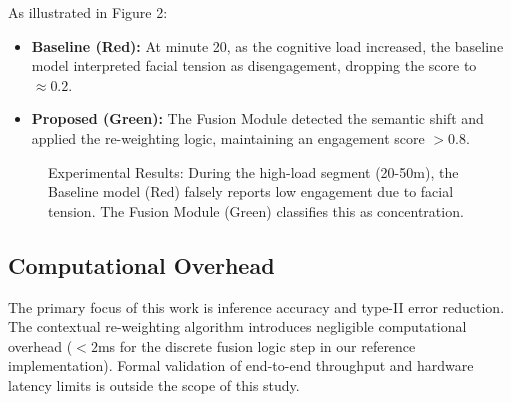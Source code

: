 \documentclass[conference]{IEEEtran}
\begin{document}
As illustrated in Figure 2:
\begin{itemize}
    \item \textbf{Baseline (Red):} At minute 20, as the cognitive load increased, the baseline model interpreted facial tension as disengagement, dropping the score to $\approx 0.2$.
    \item \textbf{Proposed (Green):} The Fusion Module detected the semantic shift and applied the re-weighting logic, maintaining an engagement score $>0.8$.
\end{itemize}

\begin{figure}[htbp]
\centering
{}
\caption{Experimental Results: During the high-load segment (20-50m), the Baseline model (Red) falsely reports low engagement due to facial tension. The Fusion Module (Green) classifies this as concentration.}
\label{fig:results}
\end{figure}

\subsection{Computational Overhead}
The primary focus of this work is inference accuracy and type-II error reduction. The contextual re-weighting algorithm introduces negligible computational overhead ($<2$ms for the discrete fusion logic step in our reference implementation). Formal validation of end-to-end throughput and hardware latency limits is outside the scope of this study.
\end{document}
